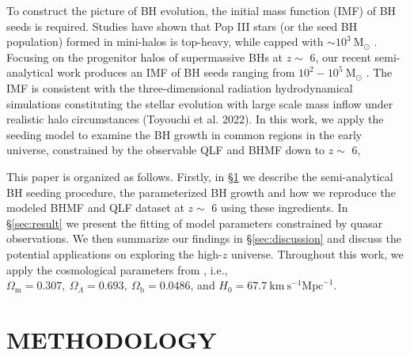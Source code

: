 \documentclass[nolinenumbers,preprint2,tighten]{aastex631}
\newcommand{\Msun}{\mathrm{M_\odot}}
\begin{document}
\begin{CJK*}{UTF8}{gbsn}
To construct the picture of BH evolution, the initial mass function (IMF) of BH seeds is required.
Studies have shown that Pop III stars (or the seed BH population) formed in mini-halos is top-heavy, while capped with $\sim 10^3~\Msun$ 
\citep{2014ApJ...781...60H,2015MNRAS.448..568H}.
Focusing on the progenitor halos of supermassive BHs at $z\sim$ 6, 
our recent semi-analytical work produces an IMF of BH seeds ranging from $10^2-10^5~\Msun$ \citep{2021ApJ...917...60L}. 
The IMF is consistent with the three-dimensional radiation hydrodynamical simulations 
constituting the stellar evolution with large scale mass inflow under realistic halo circumstances (Toyouchi et al. 2022).
In this work, we apply the seeding model to examine the BH growth in common regions in the early universe, 
constrained by the observable QLF and BHMF down to $z\sim$ 6, 

This paper is organized as follows. Firstly, in \S \ref{sec:method} we describe the semi-analytical BH seeding procedure, 
the parameterized BH growth and how we reproduce the modeled BHMF and QLF dataset at $z\sim$ 6 using these ingredients. 
In \S \ref{sec:result} we present the fitting of model parameters constrained by quasar observations. 
We then summarize our findings in \S \ref{sec:discussion} and discuss the potential applications on exploring the high-$z$ universe.
Throughout this work, we apply the cosmological parameters from \cite{2016A&A...594A..13P},
i.e., $\Omega_{\mathrm{m}}=0.307,~\Omega_{\Lambda}=0.693,~
\Omega_{\mathrm{b}}=0.0486$, and $H_0=67.7 \mathrm{~km} \mathrm{~s}^{-1} \mathrm{Mpc}^{-1}$.

\vspace{5mm}
\section{METHODOLOGY}\label{sec:method}

\vspace{2mm}

\end{CJK*}
\end{document}
